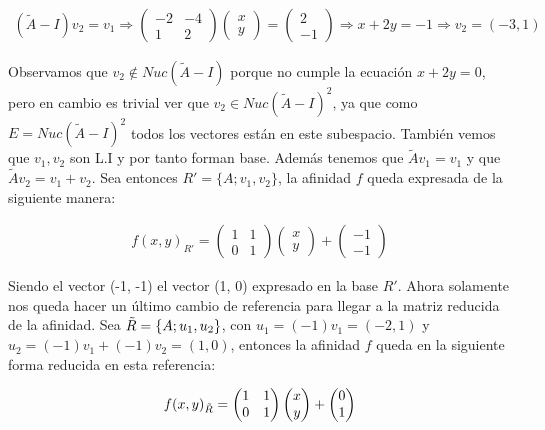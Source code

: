 \begin{gather*}
    (\widetilde{A} - I)v_2 = v_1 \Longrightarrow
    \begin{pmatrix}
    -2 & -4\\
    1 & 2
    \end{pmatrix}
    \begin{pmatrix}
    x\\ y
    \end{pmatrix}
    =
    \begin{pmatrix}
    2\\ -1
    \end{pmatrix}
    \Longrightarrow x + 2y = -1 \Longrightarrow v_2 = (-3, 1)
\end{gather*}

Observamos que $v_2 \notin Nuc(\widetilde{A} - I)$ porque no cumple la ecuación $x + 2y = 0$, pero en cambio es trivial ver que $v_2 \in Nuc(\widetilde{A} - I)^2$, ya que como $E = Nuc(\widetilde{A} - I)^2$ todos los vectores están en este subespacio. También vemos que $v_1,v_2$ son L.I y por tanto forman base. Además tenemos que $\widetilde{A}v_1 = v_1$ y que $\widetilde{A}v_2 = v_1 + v_2$. Sea entonces $R' = \{A; v_1, v_2\}$, la afinidad $f$ queda expresada de la siguiente manera:

\begin{gather*}
    f(x,y)_{R'} = 
    \begin{pmatrix}
    1 & 1\\
    0 & 1
    \end{pmatrix}
    \begin{pmatrix}
    x \\ y
    \end{pmatrix}
    +
    \begin{pmatrix}
    -1 \\ -1
    \end{pmatrix}
\end{gather*}

Siendo el vector (-1, -1) el vector (1, 0) expresado en la base $R'$. Ahora solamente nos queda hacer un último cambio de referencia para llegar a la matriz reducida de la afinidad. Sea $\Tilde{R} = \{A; u_1, u_2\}$, con $u_1 = (-1)v_1 = (-2, 1)$ y $u_2 = (-1)v_1 + (-1)v_2 = (1, 0)$, entonces la afinidad $f$ queda en la siguiente forma reducida en esta referencia:

\begin{gather}
    f(x, y)_{\Tilde{R}} = 
    \begin{pmatrix}
    1 & 1\\
    0 & 1
    \end{pmatrix}
    \begin{pmatrix}
    x\\ y
    \end{pmatrix}
    +
    \begin{pmatrix}
    0 \\ 1
    \end{pmatrix}
\end{gather}

